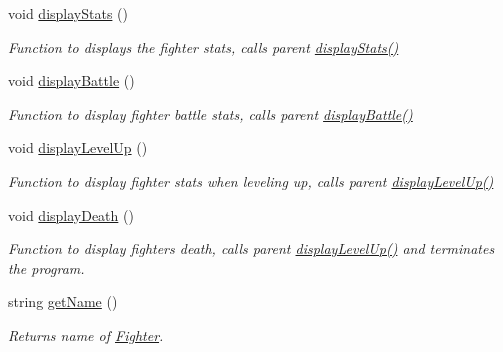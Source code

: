 \begin{DoxyCompactItemize}
void \hyperlink{class_fighter_a9e63e29c35aaca0bc60ee46efe00cc62}{display\+Stats} ()
\begin{DoxyCompactList}\small\item\em Function to displays the fighter stats, calls parent \hyperlink{class_fighter_a9e63e29c35aaca0bc60ee46efe00cc62}{display\+Stats()} \end{DoxyCompactList}\item 
\hypertarget{class_fighter_ad519375531d2f4ae2bc8896e3595d5f4}{}\label{class_fighter_ad519375531d2f4ae2bc8896e3595d5f4} 
void \hyperlink{class_fighter_ad519375531d2f4ae2bc8896e3595d5f4}{display\+Battle} ()
\begin{DoxyCompactList}\small\item\em Function to display fighter battle stats, calls parent \hyperlink{class_fighter_ad519375531d2f4ae2bc8896e3595d5f4}{display\+Battle()} \end{DoxyCompactList}\item 
\hypertarget{class_fighter_afa53e25a50772d86c5e929c6df1354ad}{}\label{class_fighter_afa53e25a50772d86c5e929c6df1354ad} 
void \hyperlink{class_fighter_afa53e25a50772d86c5e929c6df1354ad}{display\+Level\+Up} ()
\begin{DoxyCompactList}\small\item\em Function to display fighter stats when leveling up, calls parent \hyperlink{class_fighter_afa53e25a50772d86c5e929c6df1354ad}{display\+Level\+Up()} \end{DoxyCompactList}\item 
\hypertarget{class_fighter_a6a050f0b907517b09627fe16cea6e341}{}\label{class_fighter_a6a050f0b907517b09627fe16cea6e341} 
void \hyperlink{class_fighter_a6a050f0b907517b09627fe16cea6e341}{display\+Death} ()
\begin{DoxyCompactList}\small\item\em Function to display fighter\textquotesingle{}s death, calls parent \hyperlink{class_fighter_afa53e25a50772d86c5e929c6df1354ad}{display\+Level\+Up()} and terminates the program. \end{DoxyCompactList}\item 
\hypertarget{class_fighter_abf4d82d4a17d37d3b5ca4084debabde4}{}\label{class_fighter_abf4d82d4a17d37d3b5ca4084debabde4} 
string \hyperlink{class_fighter_abf4d82d4a17d37d3b5ca4084debabde4}{get\+Name} ()
\begin{DoxyCompactList}\small\item\em Returns name of \hyperlink{class_fighter}{Fighter}. \end{DoxyCompactList}\item 

\end{DoxyCompactItemize}
